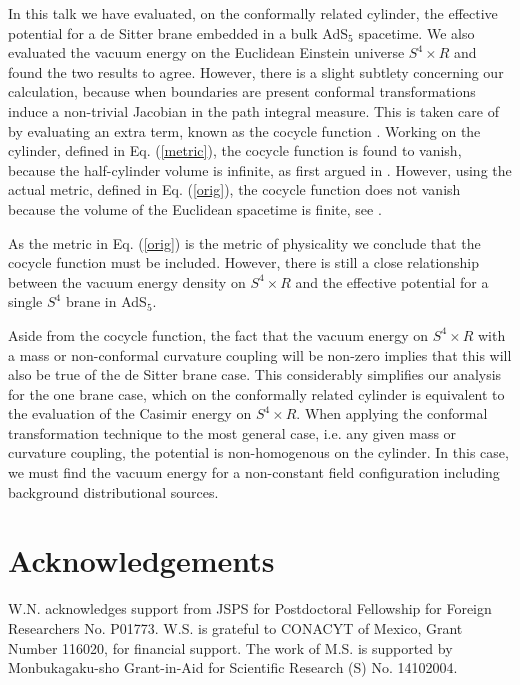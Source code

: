 \documentclass[a4paper,a4paper]{article}
\begin{document}
In this talk we have evaluated, on the conformally related cylinder, the effective potential for a 
de Sitter brane embedded in a bulk AdS$_5$ spacetime. We also evaluated the vacuum 
energy on the Euclidean Einstein universe $S^4\times R$ and found the two results 
to agree. However, there is a slight subtlety concerning our calculation, because 
when boundaries are present conformal transformations induce a 
non-trivial Jacobian in the path integral measure. This is taken care of by evaluating an 
extra term, known as the cocycle function \cite{MNSS}. Working on the cylinder, 
defined in Eq. (\ref{metric}), the cocycle function is found to vanish, because the 
half-cylinder volume is infinite, as first argued in \cite{NOZ}. However, using the actual 
metric, defined in Eq. (\ref{orig}), the cocycle function does not vanish because the 
volume of the Euclidean spacetime is finite, see \cite{MNSS}.

As the metric in Eq. (\ref{orig}) is the metric of physicality we conclude that the 
cocycle function must be included. However, there is still a close relationship between 
the vacuum energy density on $S^4\times R$ and the effective potential for a 
single $S^4$ brane in AdS$_5$.


Aside from the cocycle function, the fact that the vacuum energy on $S^4\times R$ 
with a mass or non-conformal curvature coupling will be non-zero implies that this 
will also be true of the de Sitter brane case. 
This considerably simplifies our analysis for the one brane case, which on the conformally 
related cylinder is equivalent to the evaluation of the Casimir energy on $S^4\times R$.
When applying the conformal transformation technique to the most general case, i.e. 
any given mass or curvature coupling, the potential is non-homogenous on the cylinder.
In this case, we must find the vacuum energy for a non-constant field 
configuration including background distributional sources.

\section{Acknowledgements}

W.N. acknowledges support from JSPS for Postdoctoral Fellowship for Foreign 
Researchers No. P01773.
W.S. is grateful to CONACYT of Mexico, Grant Number 116020, for financial 
support.
The work of M.S. is supported by Monbukagaku-sho Grant-in-Aid
for Scientific Research (S) No. 14102004.
\end{document}
